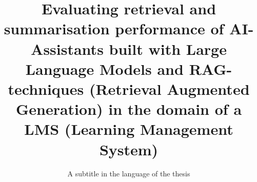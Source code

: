 \title{Evaluating retrieval and summarisation performance of AI-Assistants built with Large Language Models and RAG-techniques (Retrieval Augmented Generation) in the domain of a LMS (Learning Management System)}
\subtitle{A subtitle in the language of the thesis}






